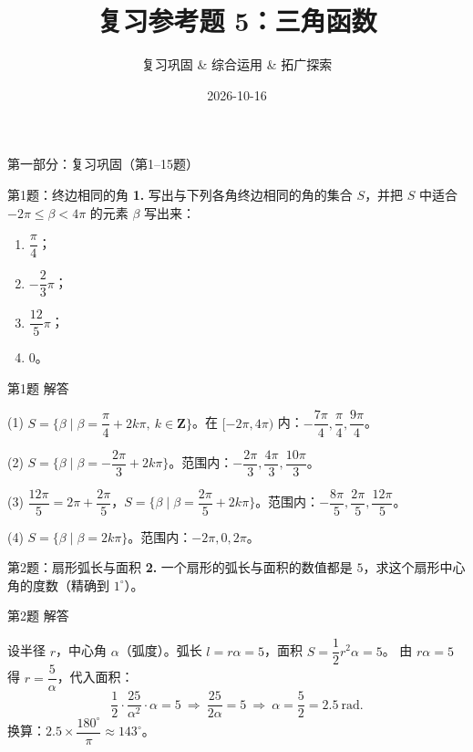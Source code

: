 \documentclass[10pt,aspectratio=169,serif]{beamer}
\title[复习参考题5]{复习参考题 5：三角函数}
\subtitle{复习巩固 \& 综合运用 \& 拓广探索}
\author{}
\institute{}
\date{2026-10-16}
\begin{document}
\begin{frame}
  \titlepage
\end{frame}

\begin{frame}{第一部分：复习巩固（第1--15题）}
\end{frame}

\begin{frame}[t]{第1题：终边相同的角}
\textbf{1.} 写出与下列各角终边相同的角的集合 $S$，并把 $S$ 中适合 $-2\pi\le\beta<4\pi$ 的元素 $\beta$ 写出来：
\begin{enumerate}
  \item $\dfrac{\pi}{4}$；\quad
  \item $-\dfrac23\pi$；\quad
  \item $\dfrac{12}{5}\pi$；\quad
  \item $0$。
\end{enumerate}
\end{frame}

\begin{frame}[t]{第1题 解答}
\begin{tcolorbox}[colback=orange!10,colframe=orange,title=\textbf{解}]
(1) $S=\{\beta\mid\beta=\dfrac{\pi}{4}+2k\pi,\ k\in\mathbf{Z}\}$。在 $[-2\pi,4\pi)$ 内：$-\dfrac{7\pi}{4},\dfrac{\pi}{4},\dfrac{9\pi}{4}$。

(2) $S=\{\beta\mid\beta=-\dfrac{2\pi}{3}+2k\pi\}$。范围内：$-\dfrac{2\pi}{3},\dfrac{4\pi}{3},\dfrac{10\pi}{3}$。

(3) $\dfrac{12\pi}{5}=2\pi+\dfrac{2\pi}{5}$，$S=\{\beta\mid\beta=\dfrac{2\pi}{5}+2k\pi\}$。范围内：$-\dfrac{8\pi}{5},\dfrac{2\pi}{5},\dfrac{12\pi}{5}$。

(4) $S=\{\beta\mid\beta=2k\pi\}$。范围内：$-2\pi,0,2\pi$。
\end{tcolorbox}
\end{frame}

\begin{frame}[t]{第2题：扇形弧长与面积}
\textbf{2.} 一个扇形的弧长与面积的数值都是 $5$，求这个扇形中心角的度数（精确到 $1^\circ$）。
\end{frame}

\begin{frame}[t]{第2题 解答}
\begin{tcolorbox}[colback=orange!10,colframe=orange,title=\textbf{解}]
设半径 $r$，中心角 $\alpha$（弧度）。弧长 $l=r\alpha=5$，面积 $S=\dfrac12 r^2\alpha=5$。
由 $r\alpha=5$ 得 $r=\dfrac{5}{\alpha}$，代入面积：
\[
\frac12\cdot\frac{25}{\alpha^2}\cdot\alpha=5\ \Longrightarrow\ \frac{25}{2\alpha}=5\ \Longrightarrow\ \alpha=\frac52=2.5\ \text{rad}.
\]
换算：$2.5\times\dfrac{180^\circ}{\pi}\approx 143^\circ$。
\end{tcolorbox}
\end{frame}
\end{document}
